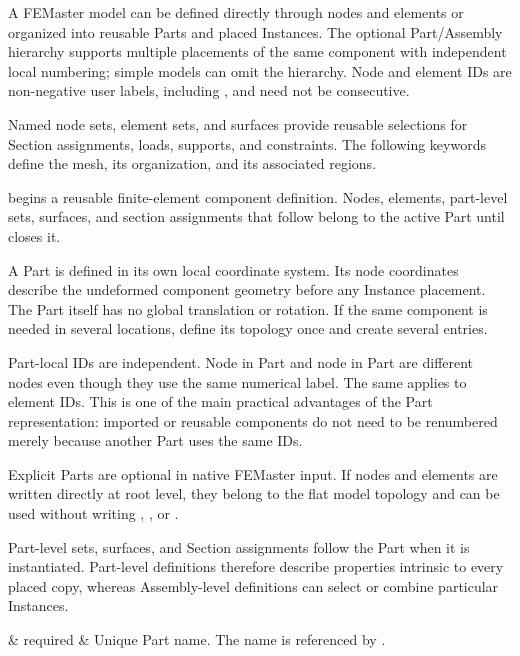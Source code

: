 A FEMaster model can be defined directly through nodes and elements
or organized into reusable Parts and placed Instances. The optional
Part/Assembly hierarchy supports multiple placements of the same
component with independent local numbering; simple models can omit
the hierarchy. Node and element IDs are non-negative user labels,
including , and need not be consecutive.

Named node sets, element sets, and surfaces provide reusable selections
for Section assignments, loads, supports, and constraints. The
following keywords define the mesh, its organization, and its
associated regions.


 begins a reusable finite-element component definition. Nodes, elements, part-level sets, surfaces, and section assignments that follow belong to the active Part until  closes it.

A Part is defined in its own local coordinate system. Its node coordinates describe the undeformed component geometry before any Instance placement. The Part itself has no global translation or rotation. If the same component is needed in several locations, define its topology once and create several  entries.

Part-local IDs are independent. Node  in Part  and node  in Part  are different nodes even though they use the same numerical label. The same applies to element IDs. This is one of the main practical advantages of the Part representation: imported or reusable components do not need to be renumbered merely because another Part uses the same IDs.

Explicit Parts are optional in native FEMaster input. If nodes and elements are written directly at root level, they belong to the flat model topology and can be used without writing , , or .

Part-level sets, surfaces, and Section assignments follow the Part when it is instantiated. Part-level definitions therefore describe properties intrinsic to every placed copy, whereas Assembly-level definitions can select or combine particular Instances.

\begin{keywordparameters}
 & required & Unique Part name. The name is referenced by . \\
\end{keywordparameters}

